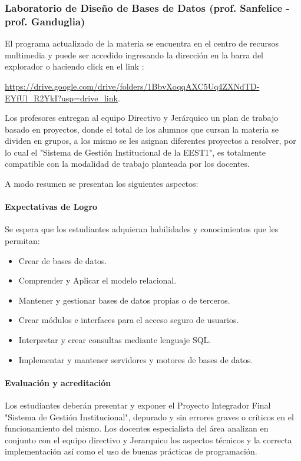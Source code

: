 
\subsubsection{Laboratorio de Diseño de Bases de Datos (prof. Sanfelice - prof. Ganduglia)} 

El programa actualizado de la materia se encuentra en el centro de recursos multimedia y puede ser accedido ingresando la dirección en la barra del explorador o haciendo click en el link : 

\url{https://drive.google.com/drive/folders/1BbvXoqqAXC5Uq4ZXNdTD-EYfUl_R2YkI?usp=drive_link}.


Los profesores entregan al equipo Directivo y Jerárquico un plan de trabajo basado en proyectos, donde el total de los alumnos que cursan la materia se dividen en grupos, a los mismo se les asignan diferentes proyectos a resolver, por lo cual el "Sistema de Gestión Institucional de la EEST1", es totalmente compatible con la modalidad de trabajo planteada por los docentes.

A modo resumen se presentan los siguientes aspectos:
\paragraph{Expectativas de Logro}
Se espera que los estudiantes adquieran habilidades y conocimientos que les permitan: 

\begin{itemize}
    \item Crear de bases de datos.
    \item Comprender y Aplicar el modelo relacional.
    \item Mantener y gestionar bases de datos propias o de terceros.
    \item Crear módulos e interfaces para el acceso seguro de usuarios.
    \item Interpretar y crear consultas mediante lenguaje SQL.
    \item Implementar y mantener servidores y motores de bases de datos. 
\end{itemize}

\paragraph{Evaluación y acreditación}

Los estudiantes deberán presentar y exponer el Proyecto Integrador Final "Sistema de Gestión Institucional", depurado y sin errores graves o críticos en el funcionamiento del mismo. Los docentes especialista del área analizan en conjunto con el equipo directivo y Jerarquico los aspectos técnicos y la correcta implementación así como el uso de buenas prácticas de programación.

